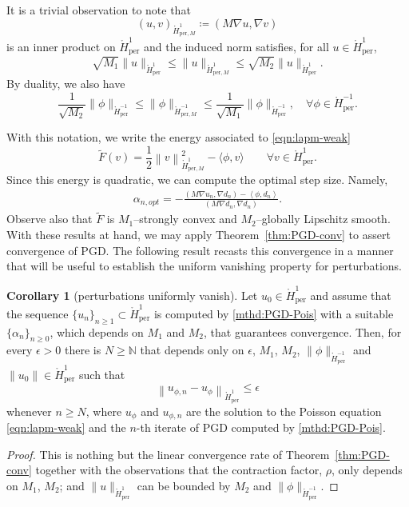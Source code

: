 \documentclass{amsart}
\newcommand{\polN}{\mathbb N}
\newcommand{\Hm}{{\mathring H_{\mathrm{per}}^{-1}}}
\newcommand{\Homz}{{\mathring{H}_{\mathrm{per}}^{1}}}
\newcommand{\HMm}{{\mathring{H}_{\mathrm{per},M}^{-1}}}
\newcommand{\HMo}{{\mathring{H}^1_{\mathrm{per},M}}}
\newcommand{\half}{\frac{1}{2}}
\newcommand{\norm}[2]{\left\| #1 \right\| _{#2}}
\newcommand{\ins}{{\alpha}} %
\theoremstyle{definition}
\newtheorem{cor}[thm]{Corollary}
\begin{document}
It is a trivial observation to note that
\begin{equation*}
  (u, v)_{\HMo}\coloneqq (M\nabla u, \nabla v)_{}
\end{equation*}
is an inner product on $\Homz$ and the induced norm satisfies, for all $u\in\Homz$,
\begin{equation}
  \sqrt{M_1} \|u\|_{\Homz} \le \|u\|_{\HMo} \le \sqrt{M_2} \|u\|_{\Homz}.
\label{est:H1-norm-equival}
\end{equation}
By duality, we also have
\begin{equation}
\label{est:-1nrm-equiv}
  \frac1{\sqrt{M_2}} \| \phi \|_{\Hm}\leq  \| \phi \|_{\HMm} \leq \frac1{\sqrt{M_1}} \|\phi \|_{\Hm}, \quad \forall \phi \in \Hm.
\end{equation}

With this notation, we write the energy associated to \eqref{eqn:lapm-weak}
\begin{equation}
	\tilde F(v) = \half \norm{v}{\HMo}^2 - \langle \phi, v \rangle \qquad \forall v\in\Homz.
	\label{obj:poisson-egy}
\end{equation}
Since this energy is quadratic, we can compute the optimal step size. Namely,
\begin{align}\label{eql:optimal-step}
  \ins_{n,opt}=-\frac{\left(M\nabla u_n,\nabla d_n\right) -\left\langle \phi,d_n \right \rangle }{\left(M\nabla d_n,\nabla d_n\right)}.
\end{align}
Observe also that $\tilde{F}$ is $M_1$--strongly convex and $M_2$--globally Lipschitz smooth. With these results at hand, we may apply Theorem~\ref{thm:PGD-conv} to assert convergence of PGD. The following result recasts this convergence in a manner that will be useful to establish the uniform vanishing property for perturbations.

\begin{cor}[perturbations uniformly vanish]\label{cor:unif-pertb}
  Let $u_0 \in \Homz$ and assume that the sequence $\{u_n\}_{n\geq 1} \subset \Homz$ is computed by \eqref{mthd:PGD-Pois} with a suitable $\{\ins_n\}_{n \geq 0}$, which depends on $M_1$ and $M_2$, that guarantees convergence. Then, for every $\epsilon >0$ there is $N \geq \polN$ that depends only on $\epsilon$, $M_1$, $M_2$, $\|\phi\|_{\Hm}$ and $\| u_0 \| \in \Homz$ such that
	\begin{equation}\label{est:PGD-Pois-unif-eps}
		\norm{u_{\phi,n}-u_{\phi}}{\Homz}\le \epsilon
	\end{equation}
	whenever $n\ge N$, where $u_{\phi}$ and $u_{\phi,n}$ are the solution to the Poisson equation \eqref{eqn:lapm-weak} and the $n$-th iterate of PGD computed by \eqref{mthd:PGD-Pois}.
\end{cor}
\begin{proof}
  This is nothing but the linear convergence rate of Theorem~\ref{thm:PGD-conv} together with the observations that the contraction factor, $\rho$, only depends on $M_1$, $M_2$; and $\| u \|_{\Homz}$ can be bounded by $M_2$ and $\|\phi\|_{\Hm}$.
\end{proof}
\end{document}
